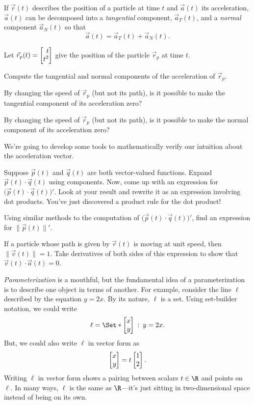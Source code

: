 	If $\vec r(t)$ describes the position of a particle at time $t$ and $\vec a(t)$ its acceleration, $\vec a(t)$
	can be decomposed into a \emph{tangential} component, $\vec a_T(t)$, and a \emph{normal} component $\vec a_N(t)$
	so that
	\[
		\vec a(t) = \vec a_T(t) +\vec a_N(t).
	\]

\begin{question}
	Let $\vec r_{p}(t) = \mat{t\\ t^2}$ give the position
	of the particle $\vec r_{p}$ at time $t$.
	\begin{parts}
		\item Compute the tangential and normal components of the acceleration of $\vec r_{p}$.
		\item By changing the speed of $\vec r_{p}$ (but not its path), is it possible to make 
			the tangential component of its acceleration zero?
		\item By changing the speed of $\vec r_{p}$ (but not its path), is it possible to make 
			the normal component of its acceleration zero?
	\end{parts}
\end{question}

	We're going to develop some tools to mathematically verify our intuition about the acceleration
	vector.

\begin{question}
	\begin{parts}
		\item Suppose $\vec p(t)$ and $\vec q(t)$ are both vector-valued functions.  Expand $\vec p(t)\cdot\vec q(t)$
		using components. Now, come up with an expression for $\Big(\vec p(t)\cdot\vec q(t)\Big)'$.  Look at your
		result and rewrite it as an expression involving dot products.
		You've just discovered a product rule for the dot product!
		\item Using similar methods to the computation of $\Big(\vec p(t)\cdot\vec q(t)\Big)'$, find an expression
			for $\|\vec p(t)\|'$.
		\item If a particle whose path is given by $\vec r(t)$ is moving at unit speed, then $\|\vec v(t)\| = 1$.
			Take derivatives of both sides of this expression to show that $\vec v(t)\cdot \vec a(t) = 0$.
	\end{parts}

\end{question}


\newpage
\emph{Parameterization} is a mouthful, but the
fundamental idea of a parameterization is to describe one object in
terms of another.  For example, consider the line $\ell$ described
by the equation $y=2x$.  By its nature, $\ell$ is a set.
Using set-builder notation, we could write
\[
	\ell = \Set*{\mat{x\\y}\given y=2x}.
\]
But, we could also write $\ell$ in vector form as 
\[
	\mat{x\\y}=t\mat{1\\2}.
\]
Writing $\ell$ in vector form shows a pairing between scalars $t\in \R$
and points on $\ell$.  In many ways, $\ell$ is the same as $\R$---it's
just sitting in two-dimensional space instead of being on its own.

